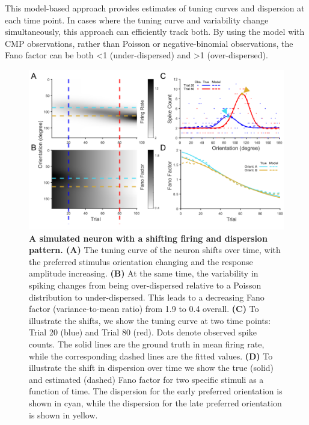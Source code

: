 \documentclass[aoas]{imsart}
\theoremstyle{plain}
\theoremstyle{remark}
\begin{document}
This model-based approach provides estimates of tuning curves and dispersion at each time point. In cases where the tuning curve and variability change simultaneously, this approach can efficiently track both. By using the model with CMP observations, rather than Poisson or negative-binomial observations, the Fano factor can be both <1 (under-dispersed) and >1 (over-dispersed).

\begin{figure}[h!]
	\centering
	\includegraphics[width=1\textwidth]{figure1.png}
	\caption{\textbf{A simulated neuron with a shifting firing and dispersion pattern. (A)} The tuning curve of the neuron shifts over time, with the preferred stimulus orientation changing and the response amplitude increasing. \textbf{(B)} At the same time, the variability in spiking changes from being over-dispersed relative to a Poisson distribution to under-dispersed. This leads to a decreasing Fano factor (variance-to-mean ratio) from 1.9 to 0.4 overall. \textbf{(C)} To illustrate the shifts, we show the tuning curve at two time points: Trial 20 (blue) and Trial 80 (red). Dots denote observed spike counts. The solid lines are the ground truth in mean firing rate, while the corresponding dashed lines are the fitted values. \textbf{(D)} To illustrate the shift in dispersion over time we show the true (solid) and estimated (dashed) Fano factor for two specific stimuli as a function of time. The dispersion for the early preferred orientation is shown in cyan, while the dispersion for the late preferred orientation is shown in yellow.}
	\label{fig1}
\end{figure}
\end{document}
